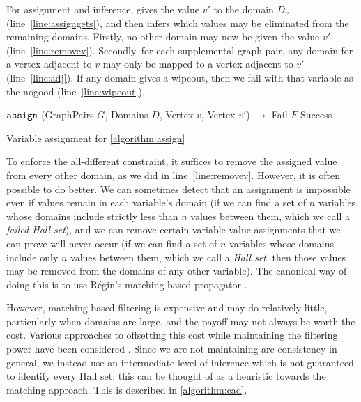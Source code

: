 \documentclass{llncs}
\newcommand{\lineref}[1]{line~\ref{#1}}
\begin{document}
For assignment and inference,  gives the value $v'$ to the domain $D_v$
(\lineref{line:assigngets}), and then infers which values may be eliminated from the remaining
domains.  Firstly, no other domain may now be given the value $v'$ (\lineref{line:removev}).
Secondly, for each supplemental graph pair, any domain for a vertex adjacent to $v$ may only be
mapped to a vertex adjacent to $v'$ (\lineref{line:adj}). If any domain gives a wipeout, then we
fail with that variable as the nogood (\lineref{line:wipeout}).

\begin{algorithm}[h]
\DontPrintSemicolon
\nl $\FuncSty{assign}$ (GraphPairs $G$, Domains $D$, Vertex $v$, Vertex $v'$) $\rightarrow$ Fail $F$  Success \;
\nl {}
\caption{Variable assignment for \cref{algorithm:assign}}
\label{algorithm:assign}
\end{algorithm}

To enforce the all-different constraint, it suffices to remove the assigned value from every other
domain, as we did in \lineref{line:removev}. However, it is often possible to do better. We can
sometimes detect that an assignment is impossible even if values remain in each variable's domain
(if we can find a set of $n$ variables whose domains include strictly less than $n$ values between
them, which we call a \emph{failed Hall set}), and we can remove certain variable-value assignments
that we can prove will never occur (if we can find a set of $n$ variables whose domains include only
$n$ values between them, which we call a \emph{Hall set}, then those values may be removed from the
domains of any other variable). The canonical way of doing this is to use R\'egin's matching-based
propagator \cite{Regin:1994}.

However, matching-based filtering is expensive and may do relatively little, particularly when
domains are large, and the payoff may not always be worth the cost. Various approaches to offsetting
this cost while maintaining the filtering power have been considered \cite{Gent:2008}. Since we are
not maintaining arc consistency in general, we instead use an intermediate level of inference which
is not guaranteed to identify every Hall set: this can be thought of as a heuristic towards the
matching approach. This is described in \cref{algorithm:cad}.
\end{document}
